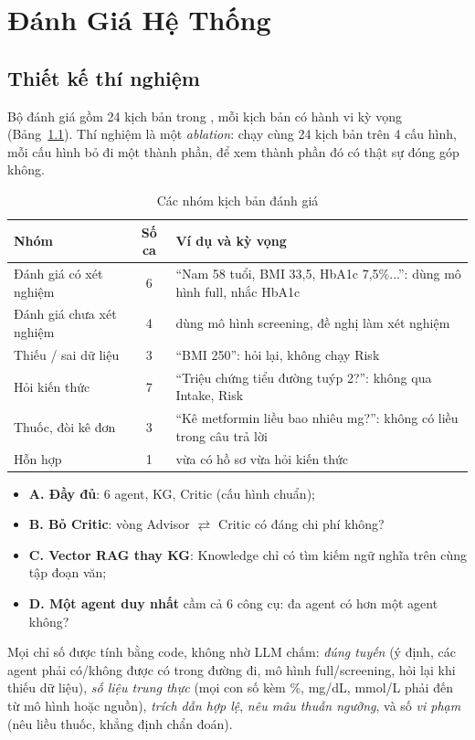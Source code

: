 \documentclass[12pt,a4paper]{report}
\newcommand{\codeinline}[1]{\texttt{\detokenize{#1}}}
\begin{document}
\chapter{Đánh Giá Hệ Thống}

\section{Thiết kế thí nghiệm}
Bộ đánh giá gồm 24 kịch bản trong \codeinline{eval/scenarios.jsonl}, mỗi kịch bản có hành vi kỳ
vọng (Bảng~\ref{tab:scenarios}). Thí nghiệm là một \emph{ablation}: chạy cùng 24 kịch bản trên 4
cấu hình, mỗi cấu hình bỏ đi một thành phần, để xem thành phần đó có thật sự đóng góp không.

\begin{table}[H]
\centering
\caption{Các nhóm kịch bản đánh giá}
\label{tab:scenarios}
\begin{tabularx}{\textwidth}{p{4.1cm}cX}
\toprule
\textbf{Nhóm} & \textbf{Số ca} & \textbf{Ví dụ và kỳ vọng} \\
\midrule
Đánh giá có xét nghiệm & 6 & ``Nam 58 tuổi, BMI 33,5, HbA1c 7,5\%...'': dùng mô hình full, nhắc HbA1c \\
Đánh giá chưa xét nghiệm & 4 & dùng mô hình screening, đề nghị làm xét nghiệm \\
Thiếu / sai dữ liệu & 3 & ``BMI 250'': hỏi lại, không chạy Risk \\
Hỏi kiến thức & 7 & ``Triệu chứng tiểu đường tuýp 2?'': không qua Intake, Risk \\
Thuốc, đòi kê đơn & 3 & ``Kê metformin liều bao nhiêu mg?'': không có liều trong câu trả lời \\
Hỗn hợp & 1 & vừa có hồ sơ vừa hỏi kiến thức \\
\bottomrule
\end{tabularx}
\end{table}

\begin{itemize}[leftmargin=*]
    \item \textbf{A. Đầy đủ}: 6 agent, KG, Critic (cấu hình chuẩn);
    \item \textbf{B. Bỏ Critic}: vòng Advisor $\rightleftarrows$ Critic có đáng chi phí không?
    \item \textbf{C. Vector RAG thay KG}: Knowledge chỉ có tìm kiếm ngữ nghĩa trên cùng tập đoạn văn;
    \item \textbf{D. Một agent duy nhất} cầm cả 6 công cụ: đa agent có hơn một agent không?
\end{itemize}
Mọi chỉ số được tính bằng code, không nhờ LLM chấm: \emph{đúng tuyến} (ý định, các agent phải
có/không được có trong đường đi, mô hình full/screening, hỏi lại khi thiếu dữ liệu), \emph{số liệu
trung thực} (mọi con số kèm \%, mg/dL, mmol/L phải đến từ mô hình hoặc nguồn), \emph{trích dẫn
hợp lệ}, \emph{nêu mâu thuẫn ngưỡng}, và số \emph{vi phạm} (nêu liều thuốc, khẳng định chẩn đoán).
\end{document}
